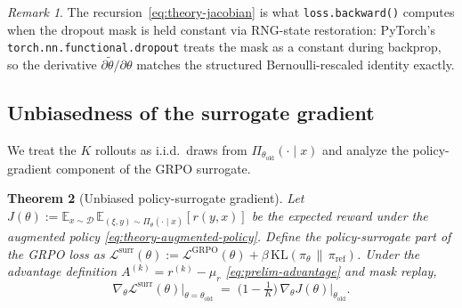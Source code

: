 \documentclass[11pt]{article}
\newtheorem{theorem}{Theorem}
\theoremstyle{definition}
\theoremstyle{remark}
\newtheorem{remark}[theorem]{Remark}
\newcommand{\E}{\mathbb{E}}
\newcommand{\KL}{\mathrm{KL}}
\newcommand{\D}{\mathcal{D}}
\newcommand{\Loss}{\mathcal{L}}
\newcommand{\old}{\mathrm{old}}
\begin{document}
\begin{remark}
The recursion~\eqref{eq:theory-jacobian} is what \texttt{loss.backward()}
computes when the dropout mask is held constant via RNG-state
restoration: PyTorch's \texttt{torch.nn.functional.dropout} treats the
mask as a constant during backprop, so the derivative
$\partial \tilde\theta/\partial \theta$ matches the structured
Bernoulli-rescaled identity exactly.
\end{remark}

\subsection{Unbiasedness of the surrogate gradient}
\label{sec:theory-unbiased}

We treat the $K$ rollouts as i.i.d.\ draws from
$\Pi_{\theta_\old}(\cdot \mid x)$ and analyze the policy-gradient
component of the GRPO surrogate.

\begin{theorem}[Unbiased policy-surrogate gradient]
\label{thm:unbiased}
Let
$J(\theta) := \E_{x \sim \D}\, \E_{(\xi, y) \sim \Pi_\theta(\cdot \mid x)}\![r(y, x)]$
be the expected reward under the augmented policy
\eqref{eq:theory-augmented-policy}.  Define the policy-surrogate part
of the GRPO loss as
$\Loss^{\mathrm{surr}}(\theta) := \Loss^{\mathrm{GRPO}}(\theta)
   + \beta\,\KL(\pi_\theta \,\|\, \pi_{\mathrm{ref}})$.
Under the advantage definition $A^{(k)} = r^{(k)} - \mu_r$
\eqref{eq:prelim-advantage} and mask replay,
\begin{equation}
\nabla_\theta \Loss^{\mathrm{surr}}(\theta)\Big|_{\theta = \theta_\old}
   \;=\;
\Big(1 - \tfrac{1}{K}\Big)\,\nabla_\theta J(\theta)\Big|_{\theta_\old}.
\label{eq:theory-unbiased}
\end{equation}
\end{theorem}
\end{document}
